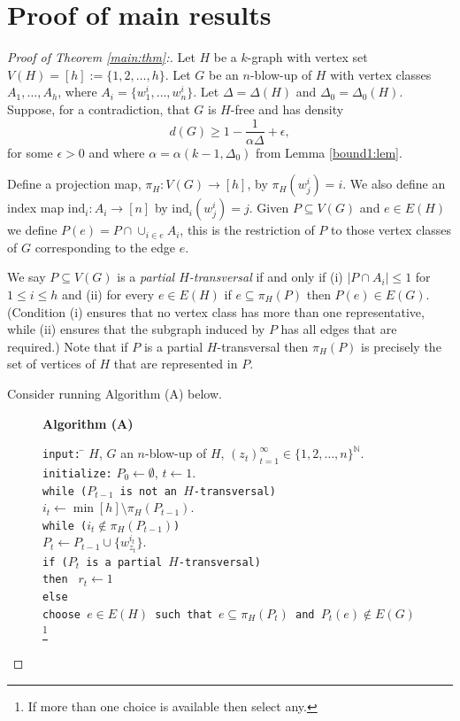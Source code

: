 \documentclass[12]{article}
\def\N{\mathbb{N}}
\def\ind{\mathrm{ind}}
\begin{document}
\section{Proof of main results}
\label{proof:sec}
\begin{proof}[Proof of Theorem \ref{main:thm}:]
Let $H$ be a $k$-graph with vertex set $V(H)=[h]:=\{1,2,\ldots,h\}$. Let $G$ be an $n$-blow-up of $H$ with vertex classes $A_1,\ldots,A_h$, where $A_i=\{w_1^i,\ldots,w_n^i\}$. Let $\Delta=\Delta(H)$ and $\Delta_0=\Delta_0(H)$.
Suppose, for a contradiction, that $G$ is $H$-free and has density \[d(G)\geq 1-\frac{1}{\alpha\Delta}+\epsilon,\] for some $\epsilon>0$ and where $\alpha=\alpha(k-1,\Delta_0)$ from Lemma \ref{bound1:lem}.


Define a projection map, $\pi_H:V(G)\to [h]$, by $\pi_H(w_j^i)=i$. We also define an index map $\ind_i:A_i\to[n]$ by $\ind_i(w_j^i)=j$. Given $P\subseteq V(G)$ and $e\in E(H)$ we define $P(e)=P\cap\cup_{i\in e}A_i$, this is the restriction of $P$ to those vertex classes of $G$ corresponding to the edge $e$.


We say $P\subseteq V(G)$ is a \emph{partial $H$-transversal} if and only if (i) $|P\cap A_i|\leq 1$ for $1\leq i \leq h$ and (ii) for every $e\in E(H)$ if $e\subseteq \pi_H(P)$ then $P(e)\in E(G)$. (Condition (i) ensures that no vertex class has more than one representative, while (ii) ensures that the subgraph induced by $P$ has all edges that are required.)
Note that if $P$ is a partial $H$-transversal then $\pi_H(P)$ is precisely the set of vertices of $H$ that are represented in $P$.

Consider running Algorithm (A) below.
\begin{figure}
  \begin{minipage}[c]{\textwidth}
    \textbf{Algorithm (A)}
  \begin{tabbing}
  \texttt{input:} \= $H$, $G$ an $n$-blow-up of $H$, $(z_{t})_{t=1}^\infty\in\{1,2,\ldots,n\}^\N$.\\
  \texttt{initialize:}  $P_0\leftarrow\emptyset$, $t\leftarrow1$.\\
  \texttt{wh}\=\texttt{ile ($P_{t-1}$ is not an $H$-transversal)} \\\> $i_t\leftarrow\min[h]\setminus \pi_H(P_{t-1})$.\\
  \>\texttt{wh}\=\texttt{ile ($i_t\not\in\pi_H(P_{t-1})$)}\\
 \>\> $P_t\leftarrow P_{t-1}\cup\{w^{i_t}_{z_t}\}$.\\
\>\>\texttt{if}\= \texttt{ ($P_t$ is a partial $H$-transversal)}\\\>\>\>\texttt{then }  $r_t\leftarrow1$\\ 
\>\> \texttt{el}\=\texttt{se}\\  
  \>\>\>\texttt{choose $e\in E(H)$ such that $e\subseteq \pi_H(P_t) $ and $P_t(e)\not\in E(G)$}\footnote{If more than one choice is available then select any.}  \\ 
  

\end{tabbing}
\end{minipage}
\end{figure}
\end{proof}
\end{document}

